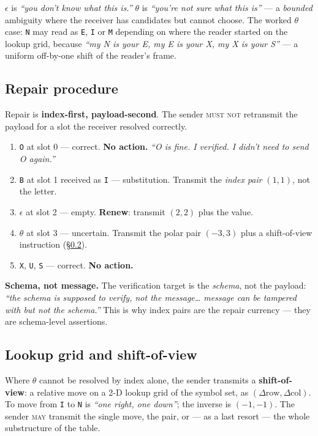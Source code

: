 \documentclass[11pt,a4paper]{article}
\newcommand{\MUSTNOT}{\textsc{must not}}
\newcommand{\MAY}{\textsc{may}}
\begin{document}
$\epsilon$ is \emph{``you don't know what this is.''} $\theta$ is \emph{``you're
not sure what this is''} --- a \emph{bounded} ambiguity where the receiver has
candidates but cannot choose. The worked $\theta$ case: \texttt{N} may read as
\texttt{E}, \texttt{I} or \texttt{M} depending on where the reader started on
the lookup grid, because \emph{``my N is your E, my E is your X, my X is your
S''} --- a uniform off-by-one shift of the reader's frame.

\subsection{Repair procedure}
\label{sec:repair}

Repair is \textbf{index-first, payload-second}. The sender \MUSTNOT{}
retransmit the payload for a slot the receiver resolved correctly.

\begin{enumerate}[leftmargin=*]
  \item \texttt{O} at slot 0 --- correct. \textbf{No action.} \emph{``O is fine.
    I verified. I didn't need to send O again.''}
  \item \texttt{B} at slot 1 received as \texttt{I} --- substitution. Transmit
    the \emph{index pair} $(1,1)$, not the letter.
  \item $\epsilon$ at slot 2 --- empty. \textbf{Renew}: transmit $(2,2)$ plus
    the value.
  \item $\theta$ at slot 3 --- uncertain. Transmit the polar pair $(-3,3)$ plus
    a shift-of-view instruction (\S\ref{sec:shift}).
  \item \texttt{X}, \texttt{U}, \texttt{S} --- correct. \textbf{No action.}
\end{enumerate}

\begin{ruleblock}
\textbf{Schema, not message.} The verification target is the \emph{schema}, not
the payload: \emph{``the schema is supposed to verify, not the message\dots{}
message can be tampered with but not the schema.''} This is why index pairs are
the repair currency --- they are schema-level assertions.
\end{ruleblock}

\subsection{Lookup grid and shift-of-view}
\label{sec:shift}

Where $\theta$ cannot be resolved by index alone, the sender transmits a
\textbf{shift-of-view}: a relative move on a 2-D lookup grid of the symbol set,
as $(\Delta\text{row}, \Delta\text{col})$. To move from \texttt{I} to \texttt{N}
is \emph{``one right, one down''}; the inverse is $(-1,-1)$. The sender \MAY{}
transmit the single move, the pair, or --- as a last resort --- the whole
substructure of the table.
\end{document}
